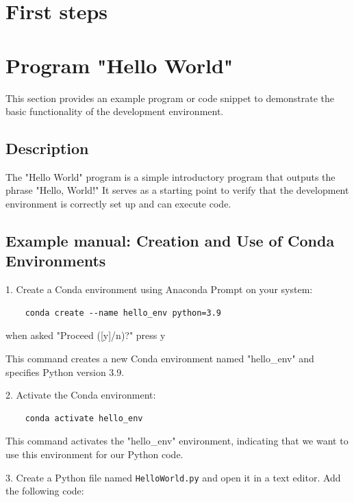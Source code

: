 \section{First steps}



\section{Program "Hello World"}
This section provides an example program or code snippet to demonstrate the basic functionality of the development environment.

\subsection{Description}
The "Hello World" program is a simple introductory program that outputs the phrase "Hello, World!" It serves as a starting point to verify that the development environment is correctly set up and can execute code.


\subsection{Example manual: Creation and Use of Conda Environments}

1. Create a Conda environment using Anaconda Prompt on your system:

\begin{verbatim}
	conda create --name hello_env python=3.9
\end{verbatim}

when asked "Proceed ([y]/n)?" press y

This command creates a new Conda environment named "hello\_env" and specifies Python version 3.9.

2. Activate the Conda environment:

\begin{verbatim}
	conda activate hello_env
\end{verbatim}

This command activates the "hello\_env" environment, indicating that we want to use this environment for our Python code.

3. Create a Python file named \texttt{HelloWorld.py} and open it in a text editor. Add the following code:

